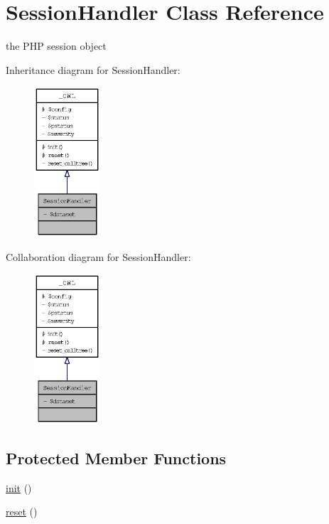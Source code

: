 \hypertarget{classSessionHandler}{
\section{SessionHandler Class Reference}
\label{classSessionHandler}
}
the PHP session object  


Inheritance diagram for SessionHandler:\nopagebreak
\begin{figure}[H]
\begin{center}
\leavevmode
\includegraphics[width=70pt]{classSessionHandler__inherit__graph}
\end{center}
\end{figure}
Collaboration diagram for SessionHandler:\nopagebreak
\begin{figure}[H]
\begin{center}
\leavevmode
\includegraphics[width=70pt]{classSessionHandler__coll__graph}
\end{center}
\end{figure}
\subsection*{Protected Member Functions}
\begin{CompactItemize}
\item 
\hyperlink{class__OWL_e0ef3ded56e8a6b34b6461e5a721cd3e}{init} ()
\item 
\hyperlink{class__OWL_2f2a042bcf31965194c03033df0edc9b}{reset} ()
\end{CompactItemize}
